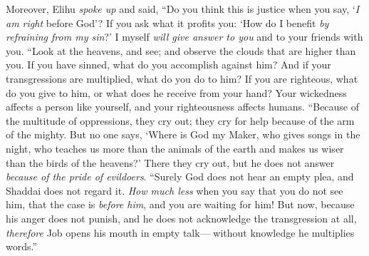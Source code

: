 \begin{biblechapter} %
 Moreover, Elihu \textit{spoke up} and said,
\verse “Do you think this is justice when you say, 
‘\textit{I am right} before God’?
\verse If you ask what it profits you: 
‘How do I benefit \textit{by refraining from my sin}?’
\verse I myself \textit{will give answer to you} 
and to your friends with you.
\verse “Look at the heavens, and see; 
and observe the clouds that are higher than you.
\verse If you have sinned, what do you accomplish against him? 
And if your transgressions are multiplied, what do you do to him?
\verse If you are righteous, what do you give to him, 
or what does he receive from your hand?
\verse Your wickedness affects a person like yourself, 
and your righteousness affects humans.
\verse “Because of the multitude of oppressions, they cry out; 
they cry for help because of the arm of the mighty.
\verse But no one says, ‘Where is God my Maker, 
who gives songs in the night,
\verse who teaches us more than the animals of the earth 
and makes us wiser than the birds of the heavens?’
\verse There they cry out, but he does not answer 
\textit{because of the pride of evildoers}.
\verse “Surely God does not hear an empty plea, 
and Shaddai does not regard it.
\verse \textit{How much less} when you say that you do not see him, 
that the case is \textit{before him}, and you are waiting for him!
\verse But now, because his anger does not punish, 
and he does not acknowledge the transgression at all,
\verse \textit{therefore} Job opens his mouth in empty talk— 
without knowledge he multiplies words.”
\end{biblechapter}

